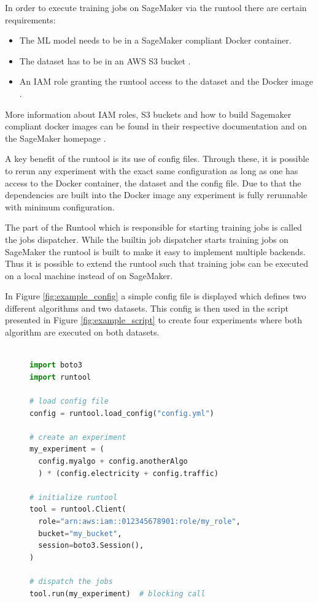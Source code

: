 In order to execute training jobs on SageMaker via the runtool there are certain requirements:
\begin{itemize}
  \item The ML model needs to be in a SageMaker compliant Docker container\cite{sagemaker_docker_documentation}.
  \item The dataset has to be in an AWS S3 bucket \cite{s3_website}.
  \item An IAM role granting the runtool access to the dataset and the Docker image \cite{iam_website}.
\end{itemize}
More information about IAM roles, S3 buckets and how to build Sagemaker compliant docker images can be found in their respective documentation \cite{sagemaker_docker_documentation,s3_website,iam_website} and on the SageMaker homepage \cite{sagemaker_website}.

A key benefit of the runtool is its use of config files. Through these, it is possible to rerun any experiment with the exact same configuration as long as one has access to the Docker container, the dataset and the config file. Due to that the dependencies are built into the Docker image any experiment is fully rerunnable with minimum configuration.

The part of the Runtool which is responsible for starting training jobs is called the jobs dispatcher. While the builtin job dispatcher starts training jobs on SageMaker the runtool is built to make it easy to implement multiple backends. Thus it is possible to extend the runtool such that training jobs can be executed on a local machine instead of on SageMaker.

In Figure \ref{fig:example_config} a simple config file is displayed which defines two different algorithms and two datasets. This config is then used in the script presented in Figure \ref{fig:example_script}  to create four experiments where both algorithm are executed on both datasets.

\begin{figure}[h]
  \begin{lstlisting}[language=Python, label={fig:example_script}, caption={Python script using the config from Figure \ref{fig:example_config} to create four experiments}]

import boto3
import runtool

# load config file
config = runtool.load_config("config.yml")

# create an experiment
my_experiment = (
  config.myalgo + config.anotherAlgo
  ) * (config.electricity + config.traffic)

# initialize runtool
tool = runtool.Client(
  role="arn:aws:iam::012345678901:role/my_role",
  bucket="my_bucket",
  session=boto3.Session(),
)

# dispatch the jobs
tool.run(my_experiment)  # blocking call

  \end{lstlisting}

\end{figure}
\clearpage


